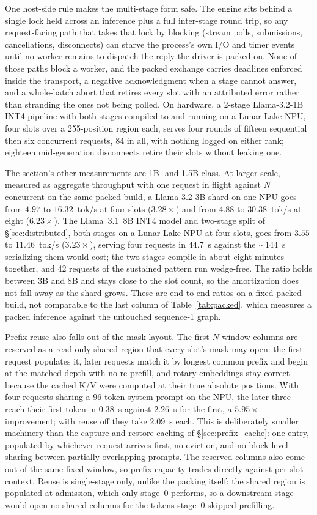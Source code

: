 \documentclass[11pt]{article}
\begin{document}
One host-side rule makes the multi-stage form safe. The engine sits behind a single lock held across an inference plus a full inter-stage round trip, so any request-facing path that takes that lock by blocking (stream polls, submissions, cancellations, disconnects) can starve the process's own I/O and timer events until no worker remains to dispatch the reply the driver is parked on. None of those paths block a worker, and the packed exchange carries deadlines enforced inside the transport, a negative acknowledgment when a stage cannot answer, and a whole-batch abort that retires every slot with an attributed error rather than stranding the ones not being polled. On hardware, a 2-stage Llama-3.2-1B INT4 pipeline with both stages compiled to and running on a Lunar Lake NPU, four slots over a 255-position region each, serves four rounds of fifteen sequential then six concurrent requests, 84 in all, with nothing logged on either rank; eighteen mid-generation disconnects retire their slots without leaking one.

The section's other measurements are 1B- and 1.5B-class. At larger scale, measured as aggregate throughput with one request in flight against $N$ concurrent on the same packed build, a Llama-3.2-3B shard on one NPU goes from $4.97$ to $16.32$~tok/s at four slots ($3.28\times$) and from $4.88$ to $30.38$~tok/s at eight ($6.23\times$). The Llama~3.1~8B INT4 model and two-stage split of \S\ref{sec:distributed}, both stages on a Lunar Lake NPU at four slots, goes from $3.55$ to $11.46$~tok/s ($3.23\times$), serving four requests in $44.7$~s against the ${\sim}144$~s serializing them would cost; the two stages compile in about eight minutes together, and 42 requests of the sustained pattern run wedge-free. The ratio holds between 3B and 8B and stays close to the slot count, so the amortization does not fall away as the shard grows. These are end-to-end ratios on a fixed packed build, not comparable to the last column of Table~\ref{tab:packed}, which measures a packed inference against the untouched sequence-1 graph.

Prefix reuse also falls out of the mask layout. The first $N$ window columns are reserved as a read-only shared region that every slot's mask may open: the first request populates it, later requests match it by longest common prefix and begin at the matched depth with no re-prefill, and rotary embeddings stay correct because the cached K/V were computed at their true absolute positions. With four requests sharing a 96-token system prompt on the NPU, the later three reach their first token in $0.38$~s against $2.26$~s for the first, a $5.95\times$ improvement; with reuse off they take $2.09$~s each. This is deliberately smaller machinery than the capture-and-restore caching of \S\ref{sec:prefix_cache}: one entry, populated by whichever request arrives first, no eviction, and no block-level sharing between partially-overlapping prompts. The reserved columns also come out of the same fixed window, so prefix capacity trades directly against per-slot context. Reuse is single-stage only, unlike the packing itself: the shared region is populated at admission, which only stage~0 performs, so a downstream stage would open no shared columns for the tokens stage~0 skipped prefilling.
\end{document}
